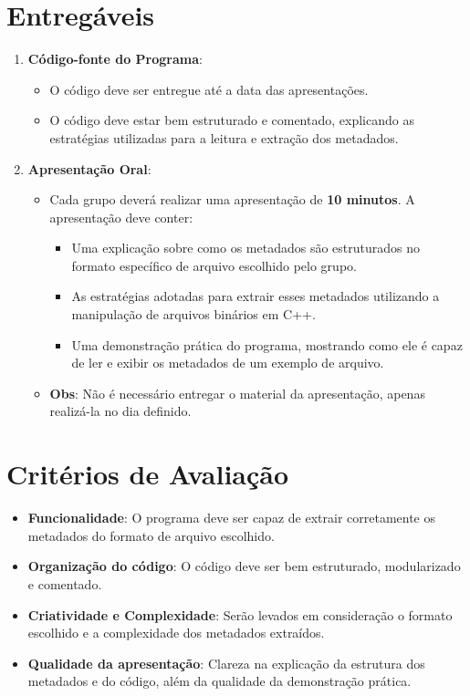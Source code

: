 \documentclass[12pt]{article}
\begin{document}
\section*{Entregáveis}
\begin{enumerate}
  \item \textbf{Código-fonte do Programa}:
    \begin{itemize}
      \item O código deve ser entregue até a data das apresentações.
      \item O código deve estar bem estruturado e comentado, explicando as estratégias utilizadas para a leitura e extração dos metadados.
    \end{itemize}
    \newpage

  \item \textbf{Apresentação Oral}:
    \begin{itemize}
      \item Cada grupo deverá realizar uma apresentação de \textbf{10 minutos}. A apresentação deve conter:
        \begin{itemize}
          \item Uma explicação sobre como os metadados são estruturados no formato específico de arquivo escolhido pelo grupo.
          \item As estratégias adotadas para extrair esses metadados utilizando a manipulação de arquivos binários em C++.
          \item Uma demonstração prática do programa, mostrando como ele é capaz de ler e exibir os metadados de um exemplo de arquivo.
        \end{itemize}
      \item \textbf{Obs}: Não é necessário entregar o material da apresentação, apenas realizá-la no dia definido.
    \end{itemize}
\end{enumerate}


\section*{Critérios de Avaliação}
\begin{itemize}
  \item \textbf{Funcionalidade}: O programa deve ser capaz de extrair corretamente os metadados do formato de arquivo escolhido.
  \item \textbf{Organização do código}: O código deve ser bem estruturado, modularizado e comentado.
  \item \textbf{Criatividade e Complexidade}: Serão levados em consideração o formato escolhido e a complexidade dos metadados extraídos.
  \item \textbf{Qualidade da apresentação}: Clareza na explicação da estrutura dos metadados e do código, além da qualidade da demonstração prática.
\end{itemize}
\end{document}
